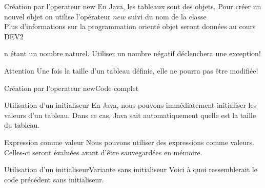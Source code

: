 \begin{frame}{Création par l'operateur new}
    En Java, les tableaux sont des objets. Pour créer un nouvel objet on utilise l'opérateur $new$ suivi du nom de la classe\\
    \tiny Plus d'informations sur la programmation orienté objet seront données au cours DEV2 \normalsize

    
    n étant un nombre naturel. Utiliser un nombre négatif déclenchera une exception!

    \begin{alertblock}{Attention}
        Une fois la taille d'un tableau d\'efinie, elle ne pourra pas être modifiée!
    \end{alertblock}
\end{frame}

\begin{frame}{Création par l'operateur new}{Code complet}
    
\end{frame}

\begin{frame}{Utilisation d'un initialiseur}
    En Java, nous pouvons immédiatement initialiser les valeurs d'un tableau.
    Dans ce cas, Java sait automatiquement quelle est la taille du tableau.
    

    \begin{exampleblock}{Expression comme valeur}
        Nous pouvons utiliser des expressions comme valeurs.
        Celles-ci seront évaluées avant d'être sauvegardées en mémoire.
    \end{exampleblock}

\end{frame}

\begin{frame}{Utilisation d'un initialiseur}{Variante sans initialiseur}
    Voici à quoi ressemblerait le code précédent sans initialiseur.
    
\end{frame}